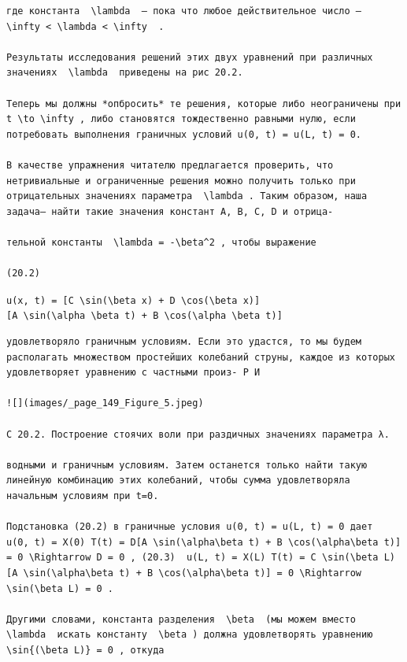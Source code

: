 \documentclass[
  ukrainian,
]{article}
\begin{document}
\begin{verbatim}
где константа  \lambda  — пока что любое действительное число —  \infty < \lambda < \infty  .

Результаты исследования решений этих двух уравнений при различных значениях  \lambda  приведены на рис 20.2.

Теперь мы должны *опбросить* те решения, которые либо неограничены при  t \to \infty , либо становятся тождественно равными нулю, если потребовать выполнения граничных условий u(0, t) = u(L, t) = 0.

В качестве упражнения читателю предлагается проверить, что нетривиальные и ограниченные решения можно получить только при отрицательных значениях параметра  \lambda . Таким образом, наша задача— найти такие значения констант A, B, C, D и отрица-

тельной константы  \lambda = -\beta^2 , чтобы выражение

(20.2)
\end{verbatim}

\texttt{u(x,\ t)\ =\ {[}C\ \textbackslash{}sin(\textbackslash{}beta\ x)\ +\ D\ \textbackslash{}cos(\textbackslash{}beta\ x){]}{[}A\ \textbackslash{}sin(\textbackslash{}alpha\ \textbackslash{}beta\ t)\ +\ B\ \textbackslash{}cos(\textbackslash{}alpha\ \textbackslash{}beta\ t){]}}

\begin{verbatim}
удовлетворяло граничным условиям. Если это удастся, то мы будем располагать множеством простейших колебаний струны, каждое из которых удовлетворяет уравнению с частными произ- Р И

![](images/_page_149_Figure_5.jpeg)

С 20.2. Построение стоячих воли при раздичных значениях параметра λ.

водными и граничным условиям. Затем останется только найти такую линейную комбинацию этих колебаний, чтобы сумма удовлетворяла начальным условиям при t=0.

Подстановка (20.2) в граничные условия u(0, t) = u(L, t) = 0 дает  u(0, t) = X(0) T(t) = D[A \sin(\alpha\beta t) + B \cos(\alpha\beta t)] = 0 \Rightarrow D = 0 , (20.3)  u(L, t) = X(L) T(t) = C \sin(\beta L) [A \sin(\alpha\beta t) + B \cos(\alpha\beta t)] = 0 \Rightarrow \sin(\beta L) = 0 .

Другими словами, константа разделения  \beta  (мы можем вместо  \lambda  искать константу  \beta ) должна удовлетворять уравнению  \sin{(\beta L)} = 0 , откуда
\end{verbatim}
\end{document}
